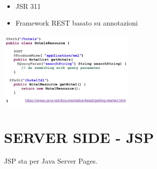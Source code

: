 \begin{itemize}
    \item JSR 311
    \item Framework REST basato su annotazioni
\end{itemize}
\begin{center}
    \includegraphics[width=0.5\textwidth]{img/appWeb14.jpg}
\end{center}

\section{SERVER SIDE - JSP}
JSP sta per Java Server Pages.

